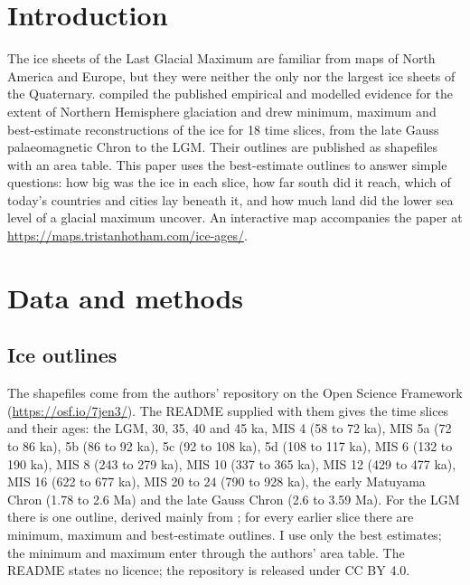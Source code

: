 \documentclass[11pt,a4paper]{article}
\begin{document}
\section{Introduction}
The ice sheets of the Last Glacial Maximum are familiar from maps of North America and Europe, but they were neither the only nor the largest ice sheets of the Quaternary. \citet{batchelor} compiled the published empirical and modelled evidence for the extent of Northern Hemisphere glaciation and drew minimum, maximum and best-estimate reconstructions of the ice for 18 time slices, from the late Gauss palaeomagnetic Chron to the LGM. Their outlines are published as shapefiles with an area table. This paper uses the best-estimate outlines to answer simple questions: how big was the ice in each slice, how far south did it reach, which of today's countries and cities lay beneath it, and how much land did the lower sea level of a glacial maximum uncover. An interactive map accompanies the paper at \url{https://maps.tristanhotham.com/ice-ages/}.

\section{Data and methods}
\subsection{Ice outlines}
The shapefiles come from the authors' repository on the Open Science Framework (\url{https://osf.io/7jen3/}). The README supplied with them gives the time slices and their ages: the LGM, 30, 35, 40 and 45 ka, MIS 4 (58 to 72 ka), MIS 5a (72 to 86 ka), 5b (86 to 92 ka), 5c (92 to 108 ka), 5d (108 to 117 ka), MIS 6 (132 to 190 ka), MIS 8 (243 to 279 ka), MIS 10 (337 to 365 ka), MIS 12 (429 to 477 ka), MIS 16 (622 to 677 ka), MIS 20 to 24 (790 to 928 ka), the early Matuyama Chron (1.78 to 2.6 Ma) and the late Gauss Chron (2.6 to 3.59 Ma). For the LGM there is one outline, derived mainly from \citet{ehlers}; for every earlier slice there are minimum, maximum and best-estimate outlines. I use only the best estimates; the minimum and maximum enter through the authors' area table. The README states no licence; the repository is released under CC BY 4.0.
\end{document}
